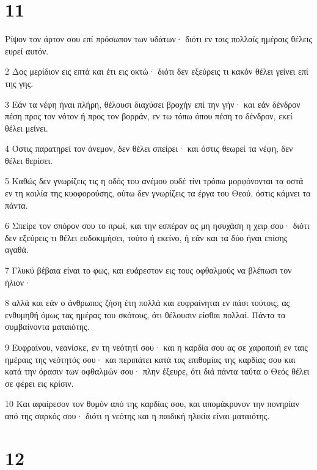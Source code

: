 \chapter{11}

\par Ρίψον τον άρτον σου επί πρόσωπον των υδάτων· διότι εν ταις πολλαίς ημέραις θέλεις ευρεί αυτόν.
\par 2 Δος μερίδιον εις επτά και έτι εις οκτώ· διότι δεν εξεύρεις τι κακόν θέλει γείνει επί της γης.
\par 3 Εάν τα νέφη ήναι πλήρη, θέλουσι διαχύσει βροχήν επί την γήν· και εάν δένδρον πέση προς τον νότον ή προς τον βορράν, εν τω τόπω όπου πέση το δένδρον, εκεί θέλει μείνει.
\par 4 Όστις παρατηρεί τον άνεμον, δεν θέλει σπείρει· και όστις θεωρεί τα νέφη, δεν θέλει θερίσει.
\par 5 Καθώς δεν γνωρίζεις τις η οδός του ανέμου ουδέ τίνι τρόπω μορφόνονται τα οστά εν τη κοιλία της κυοφορούσης, ούτω δεν γνωρίζεις τα έργα του Θεού, όστις κάμνει τα πάντα.
\par 6 Σπείρε τον σπόρον σου το πρωΐ, και την εσπέραν ας μη ησυχάση η χειρ σου· διότι δεν εξεύρεις τι θέλει ευδοκιμήσει, τούτο ή εκείνο, ή εάν και τα δύο ήναι επίσης αγαθά.
\par 7 Γλυκύ βέβαια είναι το φως, και ευάρεστον εις τους οφθαλμούς να βλέπωσι τον ήλιον·
\par 8 αλλά και εάν ο άνθρωπος ζήση έτη πολλά και ευφραίνηται εν πάσι τούτοις, ας ενθυμηθή όμως τας ημέρας του σκότους, ότι θέλουσιν είσθαι πολλαί. Πάντα τα συμβαίνοντα ματαιότης.
\par 9 Ευφραίνου, νεανίσκε, εν τη νεότητί σου· και η καρδία σου ας σε χαροποιή εν ταις ημέραις της νεότητός σου· και περιπάτει κατά τας επιθυμίας της καρδίας σου και κατά την όρασιν των οφθαλμών σου· πλην έξευρε, ότι διά πάντα ταύτα ο Θεός θέλει σε φέρει εις κρίσιν.
\par 10 Και αφαίρεσον τον θυμόν από της καρδίας σου, και απομάκρυνον την πονηρίαν από της σαρκός σου· διότι η νεότης και η παιδική ηλικία είναι ματαιότης.

\chapter{12}

